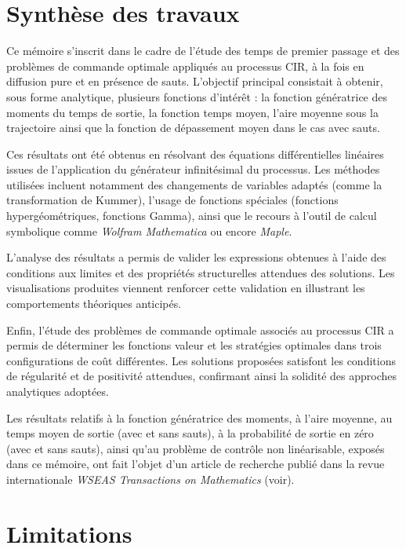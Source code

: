 \label{sec:Conclusion}
\section{Synthèse des travaux}

Ce mémoire s'inscrit dans le cadre de l'étude des temps de premier passage et des problèmes de commande optimale appliqués au processus \acs{CIR}, à la fois en diffusion pure et en présence de sauts. L'objectif principal consistait à obtenir, sous forme analytique, plusieurs fonctions d'intérêt : la fonction génératrice des moments du temps de sortie, la fonction temps moyen, l'aire moyenne sous la trajectoire ainsi que la fonction de dépassement moyen dans le cas avec sauts.

Ces résultats ont été obtenus en résolvant des équations différentielles linéaires issues de l'application du générateur infinitésimal du processus. Les méthodes utilisées incluent notamment des changements de variables adaptés (comme la transformation de Kummer), l'usage de fonctions spéciales (fonctions hypergéométriques, fonctions Gamma), ainsi que le recours à l'outil de calcul symbolique comme \textit{Wolfram Mathematica} ou encore \textit{Maple}.

L'analyse des résultats a permis de valider les expressions obtenues à l'aide des conditions aux limites et des propriétés structurelles attendues des solutions. Les visualisations produites viennent renforcer cette validation en illustrant les comportements théoriques anticipés.

Enfin, l'étude des problèmes de commande optimale associés au processus \acs{CIR} a permis de déterminer les fonctions valeur et les stratégies optimales dans trois configurations de coût différentes. Les solutions proposées satisfont les conditions de régularité et de positivité attendues, confirmant ainsi la solidité des approches analytiques adoptées.

Les résultats relatifs à la fonction génératrice des moments, à l'aire moyenne, au temps moyen de sortie (avec et sans sauts), à la probabilité de sortie en zéro (avec et sans sauts), ainsi qu'au problème de contrôle non linéarisable, exposés dans ce mémoire, ont fait l'objet d'un article de recherche publié dans la revue internationale \textit{WSEAS Transactions on Mathematics} (voir\cite{lefebvre2025}).

\section{Limitations}

